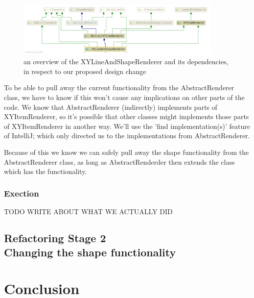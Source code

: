 \documentclass{article}
\begin{document}
\begin{figure}[H]
\centering
	\includegraphics[width=0.9\textwidth]{RefactorStage1Design.png}
	\caption{an overview of the XYLineAndShapeRenderer and its dependencies, in respect to our proposed design change}
\end{figure}

To be able to pull away the current functionality from the AbstractRenderer class, we have to know if this won't cause any implications on other parts of the code. We know that AbstractRenderer (indirectly) implements parts of XYItemRenderer, so it's possible that other classes might implements those parts of XYItemRenderer in another way. We'll use the 'find implementation(s)' feature of IntelliJ; which only directed us to the implementations from AbstractRenderer.

Because of this we know we can safely pull away the shape functionality from the AbstractRenderer class, as long as AbstractRenderder then extends the class which has the functionality. 

\subsubsection{Exection}

TODO WRITE ABOUT WHAT WE ACTUALLY DID

\subsection[Section Title. Section Subtitle]{Refactoring Stage 2\\ {\large Changing the shape functionality}}

\newpage
\section{Conclusion}
\end{document}
